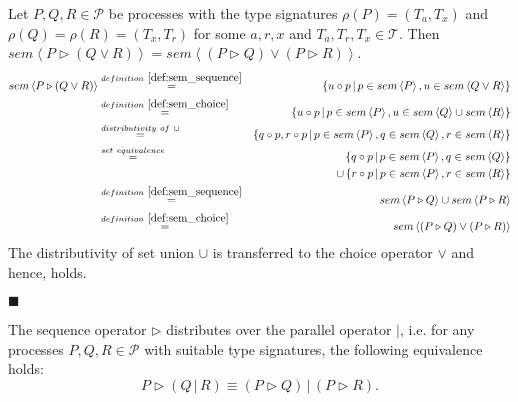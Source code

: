 \begin{myproof}
Let $P, Q, R \in \mathcal{P}$ be processes with the type signatures $\rho \left( P \right) = \left( T_a, T_x \right)$ and $\rho \left( Q \right) = \rho \left( R \right) = \left( T_x, T_r \right)$ for some $a, r, x$ and $T_a, T_r, T_x \in \mathcal{T}$. Then $sem \left\langle P \triangleright \left( Q \vee R \right) \right\rangle = sem \left\langle \left( P \triangleright Q \right) \vee \left( P \triangleright R \right) \right\rangle$.
\begin{eqnarray*}
  sem \left\langle P \triangleright \left( Q \vee R \right) \right\rangle & \overset{\defref{def:sem_sequence}}{=} & \left\{ u \circ p \,|\, p \in sem \left\langle P \right\rangle, u \in sem \left\langle Q \vee R \right\rangle \right\} \\
  & \overset{\defref{def:sem_choice}}{=} & \left\{ u \circ p \,|\, p \in sem \left\langle P \right\rangle, u \in sem \left\langle Q \right\rangle \cup sem \left\langle R \right\rangle \right\} \\
  & \overset{distributivity \ of \ \cup}{=} & \left\{ q \circ p, r \circ p \,|\, p \in sem \left\langle P \right\rangle, q \in sem \left\langle Q \right\rangle, r \in sem \left\langle R \right\rangle \right\} \\
  & \overset{set \ equivalence}{=} & \hspace*{0.8em} \left\{ q \circ p \,|\, p \in sem \left\langle P \right\rangle, q \in sem \left\langle Q \right\rangle \right\} \\  
  & & \cup \left\{ r \circ p \,|\, p \in sem \left\langle P \right\rangle, r \in sem \left\langle R \right\rangle \right\} \\
  & \overset{\defref{def:sem_sequence}}{=} & sem \left\langle P \triangleright Q \right\rangle \cup sem \left\langle P \triangleright R \right\rangle \\
  & \overset{\defref{def:sem_choice}}{=} & sem \left\langle \left( P \triangleright Q \right) \vee \left( P \triangleright R \right) \right\rangle
\end{eqnarray*}
The distributivity of set union $\cup$ is transferred to the choice operator $\vee$ and hence,  holds.

\hfill$\blacksquare$
\end{myproof}

\begin{theorem}
\label{thm:distributivity_sequence_parallel}
The sequence operator $\triangleright$ distributes over the parallel operator $|$, i.e. for any processes $P, Q, R \in \mathcal{P}$ with suitable type signatures, the following equivalence holds:
\begin{equation*}
  P \triangleright \left( Q \,|\, R \right) \equiv \left( P \triangleright Q \right) \,|\, \left( P \triangleright R \right). 
\end{equation*}
\end{theorem}

